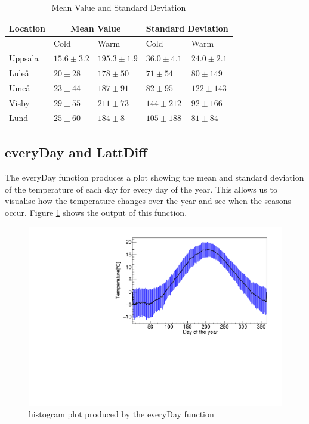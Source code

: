 \documentclass[a4paper,12pt]{article}
\begin{document}
\begin{table}[h!]
    \centering
    \begin{tabular}{l l l l l}
    \hline
    Location     & \multicolumn{2}{c}{Mean Value}     
             & \multicolumn{2}{c}{Standard Deviation}\\
    \hline
             & Cold           & Warm          & Cold           & Warm  \\

    Uppsala  & $15.6\pm3.2$ & $195.3\pm1.9$ & $36.0\pm4.1$ & $24.0\pm2.1$\\
    
    Luleå    & $20\pm28$   & $178\pm50$   & $71\pm54$      & $80\pm149$ \\
    
    Umeå     & $23\pm44$   & $187\pm91$   & $82\pm95$      & $122\pm143$ \\
    
    Visby    & $29\pm55$   & $211\pm73$   & $144\pm212$    & $92\pm166$ \\
    
    Lund     & $25\pm60$   & $184\pm8$    & $105\pm188$    & $81\pm84$ \\
    \hline
    \end{tabular}
    \caption{Mean Value and Standard Deviation }
    \label{tab:WarmCold_Table}
\end{table}




\subsection{everyDay and LattDiff}

The everyDay function produces a plot showing the mean and standard deviation of the temperature of each day for every day of the year. This allows us to visualise how the temperature changes over the year and see when the seasons occur. Figure \ref{fig:everyDay} shows the output of this function.\\

\begin{figure}[h!]
    \centering
    \includegraphics[scale = 0.7]{every_day_graph_one_location_histogram.pdf}
    \caption{histogram plot produced by the everyDay function}
    \label{fig:everyDay}
\end{figure}
\end{document}
